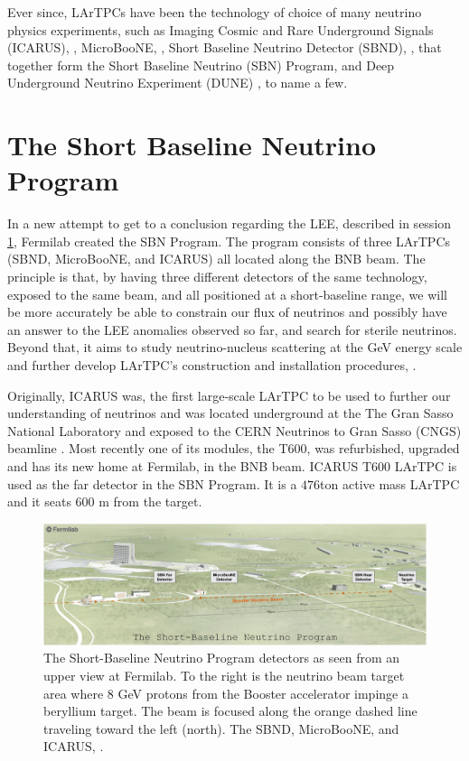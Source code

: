 Ever since, LArTPCs have been the technology of choice of many neutrino physics experiments, such as  Imaging Cosmic and Rare Underground Signals (ICARUS), \cite{ICARUS_proposal}, MicroBooNE, \cite{MicroBooNE}, Short Baseline Neutrino Detector (SBND), \cite{SBND}, that together form the Short Baseline Neutrino (SBN) Program, and Deep Underground Neutrino Experiment (DUNE) \cite{DUNE_proposal}, to name a few. 

\section{The Short Baseline Neutrino Program}

In a new attempt to get to a conclusion regarding the LEE, described in session \ref{}, Fermilab created the SBN Program. The program consists of three LArTPCs (SBND, MicroBooNE, and ICARUS) all located along the BNB beam. The principle is that, by having three different detectors of the same technology, exposed to the same beam, and all positioned at a short-baseline range, we will be more accurately be able to constrain our flux of neutrinos and possibly have an answer to the LEE anomalies observed so far, and search for sterile neutrinos. Beyond that, it aims to study neutrino-nucleus scattering at the GeV energy scale and further develop LArTPC's construction and installation procedures, \cite{SBN}.

Originally, ICARUS was, the first large-scale LArTPC to be used to further our understanding of neutrinos and was located underground at the The Gran Sasso National Laboratory and exposed to the CERN Neutrinos to Gran Sasso (CNGS) beamline \cite{ICARUS_proposal}. Most recently one of its modules, the T600, was refurbished, upgraded and has its new home at Fermilab, in the BNB beam. ICARUS T600 LArTPC is used as the far detector in the SBN Program. It is a $476$ton active mass LArTPC and it seats $600$ m from the target. 

\begin{figure}
	\begin{center}
		\includegraphics[scale=0.6]{Figures/SBN.png}
		\caption[SBN Program]{The Short-Baseline Neutrino Program detectors as seen from an upper view at Fermilab. To the right is the neutrino beam target area where 8 GeV protons from the Booster accelerator impinge a beryllium target. The beam is focused along the orange dashed line traveling toward the left (north). The SBND, MicroBooNE, and ICARUS, \cite{SBN}.
		}
		\label{sbn_program}
	\end{center}
\end{figure}

